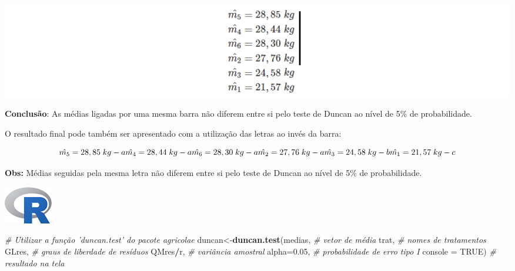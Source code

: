 \documentclass[
]{book}
\newenvironment{Shaded}{\begin{snugshade}}{\end{snugshade}}
\newcommand{\CommentTok}[1]{\textcolor[rgb]{0.56,0.35,0.01}{\textit{#1}}}
\newcommand{\DataTypeTok}[1]{\textcolor[rgb]{0.13,0.29,0.53}{#1}}
\newcommand{\FloatTok}[1]{\textcolor[rgb]{0.00,0.00,0.81}{#1}}
\newcommand{\KeywordTok}[1]{\textcolor[rgb]{0.13,0.29,0.53}{\textbf{#1}}}
\newcommand{\NormalTok}[1]{#1}
\newcommand{\OperatorTok}[1]{\textcolor[rgb]{0.81,0.36,0.00}{\textbf{#1}}}
\newcommand{\OtherTok}[1]{\textcolor[rgb]{0.56,0.35,0.01}{#1}}
\begin{document}
\includegraphics[width=12.86in]{m4_1}

\textbf{Conclusão}: As médias ligadas por uma mesma barra não diferem entre si pelo teste de Duncan ao nível de 5\% de probabilidade.

O resultado final pode também ser apresentado com a utilização das letras ao invés da barra:

\[
\hat{m_5} = 28,85\;kg - a\\
\hat{m_4} = 28,44\;kg - a\\
\hat{m_6} = 28,30\;kg - a\\
\hat{m_2} = 27,76\;kg - a\\
\hat{m_3} = 24,58\;kg - b\\
\hat{m_1} = 21,57\;kg - c
\]

\textbf{Obs:} Médias seguidas pela mesma letra não diferem entre si pelo teste de Duncan ao nível de 5\% de probabilidade.

\includegraphics{Rlogo.png}

\begin{Shaded}
\begin{Highlighting}[]
\CommentTok{# Utilizar a função 'duncan.test' do pacote agricolae}
\NormalTok{duncan<-}\KeywordTok{duncan.test}\NormalTok{(medias, }\CommentTok{# vetor de média}
\NormalTok{                trat, }\CommentTok{# nomes de tratamentos}
\NormalTok{                GLres, }\CommentTok{# graus de liberdade de resíduos}
\NormalTok{                QMres}\OperatorTok{/}\NormalTok{r, }\CommentTok{# variância amostral}
                \DataTypeTok{alpha=}\FloatTok{0.05}\NormalTok{, }\CommentTok{# probabilidade de erro tipo I}
                \DataTypeTok{console =} \OtherTok{TRUE}\NormalTok{) }\CommentTok{# resultado na tela}
\end{Highlighting}
\end{Shaded}
\end{document}
